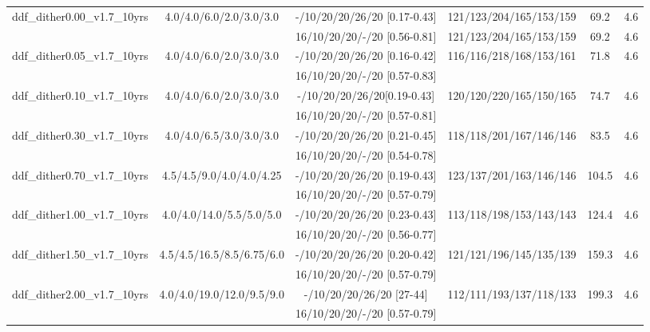\begin{table}[!htbp]
\begin{adjustbox}{width=1.2\linewidth,center}
\begin{tabular}{c|c|c|c|c|c}
\hline 
ddf\_dither0.00\_v1.7\_10yrs & 4.0/4.0/6.0/2.0/3.0/3.0 & -/10/20/20/26/20 [0.17-0.43] & 121/123/204/165/153/159 & 69.2 & 4.6 \\
                                                        &                                      & 16/10/20/20/-/20 [0.56-0.81] & 121/123/204/165/153/159 & 69.2 & 4.6 \\
\hline 
ddf\_dither0.05\_v1.7\_10yrs & 4.0/4.0/6.0/2.0/3.0/3.0 & -/10/20/20/26/20 [0.16-0.42] & 116/116/218/168/153/161 & 71.8 & 4.6 \\
& & 16/10/20/20/-/20 [0.57-0.83] &&& \\ 
\hline
ddf\_dither0.10\_v1.7\_10yrs & 4.0/4.0/6.0/2.0/3.0/3.0 & -/10/20/20/26/20[0.19-0.43] & 120/120/220/165/150/165 & 74.7 & 4.6 \\
& & 16/10/20/20/-/20 [0.57-0.81] &&& \\ 
\hline
ddf\_dither0.30\_v1.7\_10yrs & 4.0/4.0/6.5/3.0/3.0/3.0 & -/10/20/20/26/20 [0.21-0.45] & 118/118/201/167/146/146 & 83.5 & 4.6 \\
& & 16/10/20/20/-/20 [0.54-0.78] &&& \\ 
\hline
ddf\_dither0.70\_v1.7\_10yrs & 4.5/4.5/9.0/4.0/4.0/4.25 & -/10/20/20/26/20 [0.19-0.43] & 123/137/201/163/146/146 & 104.5 & 4.6 \\
& & 16/10/20/20/-/20 [0.57-0.79] &&& \\ 
\hline
ddf\_dither1.00\_v1.7\_10yrs & 4.0/4.0/14.0/5.5/5.0/5.0 & -/10/20/20/26/20 [0.23-0.43] & 113/118/198/153/143/143 & 124.4 & 4.6 \\
& & 16/10/20/20/-/20 [0.56-0.77] &&& \\ 
\hline
ddf\_dither1.50\_v1.7\_10yrs & 4.5/4.5/16.5/8.5/6.75/6.0 & -/10/20/20/26/20 [0.20-0.42] & 121/121/196/145/135/139 & 159.3 & 4.6 \\
& & 16/10/20/20/-/20 [0.57-0.79] &&& \\ 
\hline 
ddf\_dither2.00\_v1.7\_10yrs & 4.0/4.0/19.0/12.0/9.5/9.0 & -/10/20/20/26/20 [27-44] & 112/111/193/137/118/133 & 199.3 & 4.6 \\
& & 16/10/20/20/-/20 [0.57-0.79] &&& \\ 
\end{tabular} 
\end{adjustbox} 
\end{table} 
